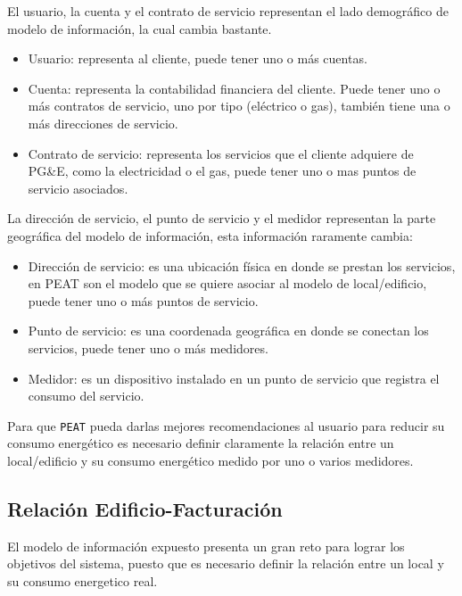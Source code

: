 
El usuario, la cuenta y el contrato de servicio representan el lado demográfico de modelo de
información, la cual cambia bastante.

\begin{itemize}
\item Usuario: representa al cliente, puede tener uno o más cuentas.
\item Cuenta: representa la contabilidad financiera del cliente. Puede
  tener uno o más contratos de servicio, uno por tipo (eléctrico o gas),
  también tiene una o más direcciones de servicio.
\item Contrato de servicio: representa los servicios que el cliente adquiere
  de PG\&E, como la electricidad o el gas, puede tener uno o mas puntos
  de servicio asociados.
\end{itemize}

La dirección de servicio, el punto de servicio y el medidor representan la parte geográfica
del modelo de información, esta información raramente cambia:

\begin{itemize}
\item Dirección de servicio: es una ubicación física en donde se prestan los servicios, en
  PEAT son el modelo que se quiere asociar al modelo de local/edificio, puede tener
  uno o más puntos de servicio.
\item Punto de servicio: es una coordenada geográfica en donde se conectan los servicios,
  puede tener uno o más medidores.
\item Medidor: es un dispositivo instalado en un punto de servicio que registra el
  consumo del servicio.
\end{itemize}


Para que \texttt{PEAT} pueda darlas mejores recomendaciones al usuario para reducir su consumo
energético es necesario definir claramente la relación entre un local/edificio y su consumo
energético medido por uno o varios medidores.

\subsection{Relación Edificio-Facturación}
El modelo de información expuesto presenta un gran reto para lograr los objetivos del sistema,
puesto que es necesario definir la relación entre un local y su consumo energetico real.

